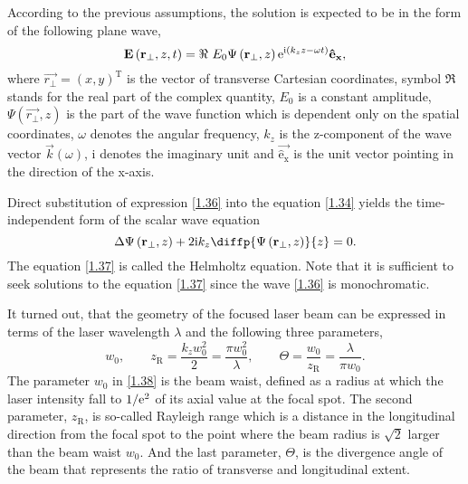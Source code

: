 According to the previous assumptions, the solution is expected to be in the form of the following plane wave,
\begin{equation}
\label{1.36}
\mathbf{E}\left(\mathbf{r_\bot}, z, t \right)  = \Re \ E_0 \Psi \left(\mathbf{r_\bot}, z \right) \mathrm{e}^{\mathrm{i} \left(k_z z - \omega t \right)} \mathrm{\mathbf{\hat{e}_x}},
\end{equation}
where $ \vec{r_\bot} = (x, y)^{\mathrm{T}} $ is the vector of transverse Cartesian coordinates, symbol $ \Re $ stands for the real part of the complex quantity, $ E_0 $ is a constant amplitude, $ \Psi \left(\vec{r_\bot}, z \right) $ is the part of the wave function which is dependent only on the spatial coordinates, $ \omega $ denotes the angular frequency, $ k_z $ is the z-component of the wave vector $ \vec{k}\left(\omega \right) $, $ \mathrm{i} $ denotes the imaginary unit and $ \mathrm{\vec{\hat{e}_x}} $ is the unit vector pointing in the direction of the x-axis.

Direct substitution of expression \ref{1.36} into the equation \ref{1.34} yields the time-independent form of the scalar wave equation
\begin{equation}
\label{1.37}
\laplace{\Psi \left(\vec{r_\bot}, z \right)} + 2 \i k_z \diffp{\Psi \left(\vec{r_\bot}, z \right)}{z} = 0.
\end{equation}
The equation \ref{1.37} is called the Helmholtz equation. Note that it is sufficient to seek solutions to the equation \ref{1.37} since the wave \ref{1.36} is monochromatic.

It turned out, that the geometry of the focused laser beam can be expressed in terms of the laser wavelength $ \lambda $ and the following three parameters,
\begin{equation}
\label{1.38}
w_0, \qquad z_{\mathrm{R}} = \frac{k_z w_0^2}{2} = \frac{\pi w_0^2}{\lambda}, \qquad \Theta = \frac{w_0}{z_\mathrm{R}} = \frac{\lambda}{\pi w_0}.
\end{equation}
The parameter $ w_0 $ in \ref{1.38} is the beam waist, defined as a radius at which the laser intensity fall to $ 1/\mathrm{e}^2 $ of its axial value at the focal spot. The second parameter, $ z_\mathrm{R} $, is so-called Rayleigh range which is a distance in the longitudinal direction from the focal spot to the point where the beam radius is $ \sqrt{2} $ larger than the beam waist $ w_0 $. And the last parameter, $ \Theta $, is the divergence angle of the beam that represents the ratio of transverse and longitudinal extent.

